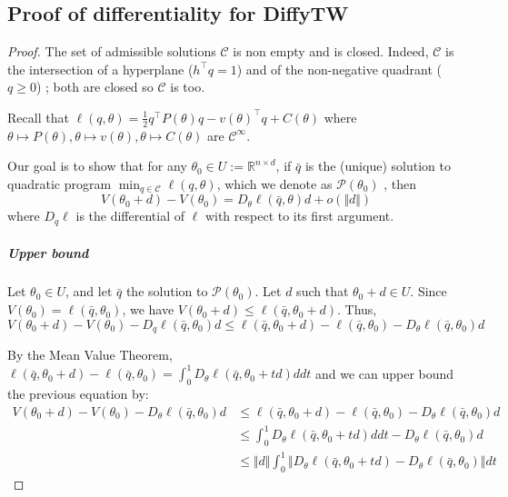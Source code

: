 \subsection{Proof of differentiality for DiffyTW}\label{sec:proof-diffytw-grad}
\begin{proof}

The set of admissible solutions $\mathcal C$ is non empty and is closed. Indeed, $\mathcal C$ is the intersection of a hyperplane ($h^\top q=1$) and of the non-negative quadrant ($q \geq 0$) ; both are closed so $\mathcal C$ is too.

Recall that $\ell(q, \theta) = \frac{1}{2}q^\top P(\theta) q - v(\theta)^\top q + C(\theta)$ where $\theta \mapsto P(\theta), \theta \mapsto v(\theta), \theta \mapsto C(\theta)$ are $\mathcal C^\infty$.

Our goal is to show that for any $\theta_0\in U :=\mathbb R^{n \times d}$, if $\bar q$ is the (unique) solution to quadratic program $\min_{q\in\mathcal C}\ell(q, \theta)$, which we denote as $\mathcal P(\theta_0)$ , then
   \begin{equation}\label{eq:goal}
       V(\theta_0 + d) - V(\theta_0) = D_\theta \ell(\bar q, \theta)d + o\left(\Vert d\Vert\right)
   \end{equation}
   where $D_q \ell$ is the differential of $\ell$ with respect to its first argument.

   \subparagraph{Upper bound}
   Let $\theta_0 \in U$, and let $\bar q$ the solution to $\mathcal P(\theta_0)$. Let $d$ such that $\theta_0 + d \in U$. Since $V(\theta_0) = \ell(\bar q, \theta_0)$, we have $V(\theta_0+d) \leq \ell(\bar q, \theta_0 + d)$. Thus,
   \begin{equation}
       V(\theta_0 + d) - V(\theta_0) - D_q\ell(\bar q, \theta_0)d \leq \ell(\bar q, \theta_0 + d) - \ell(\bar q, \theta_0) - D_\theta \ell(\bar q, \theta_0)d
   \end{equation}

By the Mean Value Theorem, $\ell(\bar q, \theta_0 + d) - \ell(\bar q, \theta_0) = \int_0^1 D_\theta\ell(\bar q, \theta_0 + td)ddt$ and we can upper bound the previous equation by:
   \begin{align}
       V(\theta_0 + d) - V(\theta_0) - D_\theta\ell(\bar q, \theta_0)d&\leq \ell(\bar q, \theta_0 + d) - \ell(\bar q, \theta_0) - D_\theta \ell(\bar q, \theta_0)d\\
       &\leq \int_0^1 D_\theta\ell(\bar q, \theta_0 + td)ddt  - D_\theta \ell(\bar q, \theta_0)d\\
        &\leq \Vert d\Vert \int_0^1 \Vert D_\theta\ell(\bar q, \theta_0 +td) - D_\theta\ell(\bar q, \theta_0)\Vert dt
   \end{align}


\end{proof}
